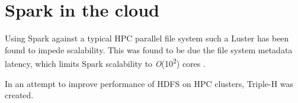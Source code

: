 \documentclass{report}
\begin{document}
	\section{Spark in the cloud}
	
	
	
	
	
	
	
	Using Spark against a typical HPC parallel file system such a Luster has been found to impede scalability. This was found to be due the file system metadata latency, which limits Spark scalability to \textit{O}(10\textsuperscript{2}) cores \cite{Chaimov:2016}.
	
	

	

	
	
	
	In an attempt to improve performance of HDFS on HPC clusters, Triple-H was created.
\end{document}
